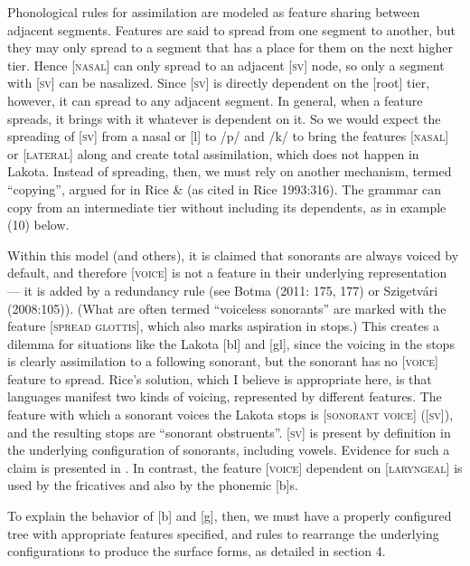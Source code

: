 \documentclass[output=paper]{LSP/langsci}
\begin{document}
Phonological rules for assimilation are modeled as feature sharing between adjacent segments. Features are said to spread from one segment to another, but they may only spread to a segment that has a place for them on the next higher tier. Hence [\textsc{nasal}] can only spread to an adjacent [\textsc{sv}] node, so only a segment with [\textsc{sv}] can be nasalized. Since [\textsc{sv}] is directly dependent on the [root] tier, however, it can spread to any adjacent segment. In general, when a feature spreads, it brings with it whatever is dependent on it. So we would expect the spreading of [\textsc{sv}] from a nasal or [l] to /p/ and /k/ to bring the features [\textsc{nasal}] or [\textsc{lateral}] along and create total assimilation, which does not happen in Lakota. Instead of spreading, then, we must rely on another mechanism, termed ``copying'', argued for in Rice \& \citet{Avery1991} (as cited in Rice 1993:316). The grammar can copy from an intermediate tier without including its dependents, as in example (10) below.

Within this model (and others), it is claimed that sonorants are always voiced by default, and therefore [\textsc{voice}] is not a feature in their underlying representation --- it is added by a redundancy rule (see Botma (2011: 175, 177) or Szigetv\'ari (2008:105)). (What are often termed ``voiceless sonorants'' are marked with the feature [\textsc{spread glottis}], which also marks aspiration in stops.) This creates a dilemma for situations like the Lakota [bl] and [gl], since the voicing in the stops is clearly assimilation to a following sonorant, but the sonorant has no [\textsc{voice}] feature to spread. Rice's solution, which I believe is appropriate here, is that languages manifest two kinds of voicing, represented by different features. The feature with which a sonorant voices the Lakota stops is [\textsc{sonorant voice}] ([\textsc{sv}]), and the resulting stops are ``sonorant obstruents''. [\textsc{sv}] is present by definition in the underlying configuration of sonorants, including vowels. Evidence for such a claim is presented in \citet{Rice1993}. In contrast, the feature [\textsc{voice}] dependent on [\textsc{laryngeal}] is used by the fricatives and also by the phonemic [b]s.

To explain the behavior of [b] and [g], then, we must have a properly configured tree with appropriate features specified, and rules to rearrange the underlying configurations to produce the surface forms, as detailed in section 4.
\end{document}

